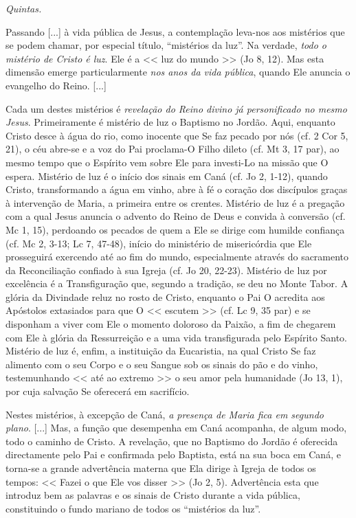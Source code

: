\documentclass{rosario}
\begin{document}
\emph{Quintas.}


Passando [...] à vida pública de Jesus, a contemplação leva-nos aos mistérios que se podem chamar, por especial título, ``mistérios da luz''.
Na verdade, \emph{todo o mistério de Cristo é luz}.
Ele é a << luz do mundo >> (Jo 8, 12).
Mas esta dimensão emerge particularmente \emph{nos anos da vida pública}, quando Ele anuncia o evangelho do Reino.
[...]

Cada um destes mistérios é \emph{revelação do Reino divino já personificado no mesmo Jesus}.
Primeiramente é mistério de luz o Baptismo no Jordão.
Aqui, enquanto Cristo desce à água do rio, como inocente que Se faz pecado por nós (cf. 2 Cor 5, 21), o céu abre-se e a voz do Pai proclama-O Filho dileto (cf. Mt 3, 17 par), ao mesmo tempo que o Espírito vem sobre Ele para
investi-Lo na missão que O espera.
Mistério de luz é o início dos sinais em Caná (cf. Jo 2, 1-12), quando Cristo, transformando a água em vinho, abre à fé o coração dos discípulos graças à intervenção de Maria, a primeira entre os crentes.
Mistério de luz é a pregação com a qual Jesus anuncia o advento do Reino de Deus e convida à conversão (cf. Mc 1, 15), perdoando os pecados de quem a Ele se dirige com humilde confiança (cf. Mc 2, 3-13; Lc 7, 47-48), início do ministério de misericórdia que Ele prosseguirá exercendo até ao fim do mundo, especialmente através do
sacramento da Reconciliação confiado à sua Igreja (cf. Jo 20, 22-23).
Mistério de luz por excelência é a Transfiguração que, segundo a tradição, se deu no Monte Tabor.
A glória da Divindade reluz no rosto de Cristo, enquanto o Pai O acredita aos Apóstolos extasiados para que O << escutem >> (cf. Lc 9, 35 par) e se disponham a viver com Ele o momento doloroso da Paixão, a fim de chegarem com Ele à glória da Ressurreição e a uma vida transfigurada pelo Espírito Santo.
Mistério de luz é, enfim, a instituição da Eucaristia, na qual Cristo Se faz alimento com o seu Corpo e o seu Sangue sob os sinais do pão e do vinho, testemunhando << até ao extremo >> o seu amor pela humanidade (Jo 13, 1), por cuja salvação Se oferecerá em sacrifício.

Nestes mistérios, à excepção de Caná, \emph{a presença de Maria fica em segundo plano}.
[...]
Mas, a função que desempenha em Caná acompanha, de algum modo, todo o caminho de Cristo.
A revelação, que no Baptismo do Jordão é oferecida directamente pelo Pai e confirmada pelo Baptista, está na sua boca em Caná, e torna-se a grande advertência materna que Ela dirige à Igreja de todos os tempos:
<< Fazei o que Ele vos disser >> (Jo 2, 5).
Advertência esta que introduz bem as palavras e os sinais de Cristo durante a vida pública, constituindo o fundo mariano de todos os ``mistérios da luz''.
\end{document}
